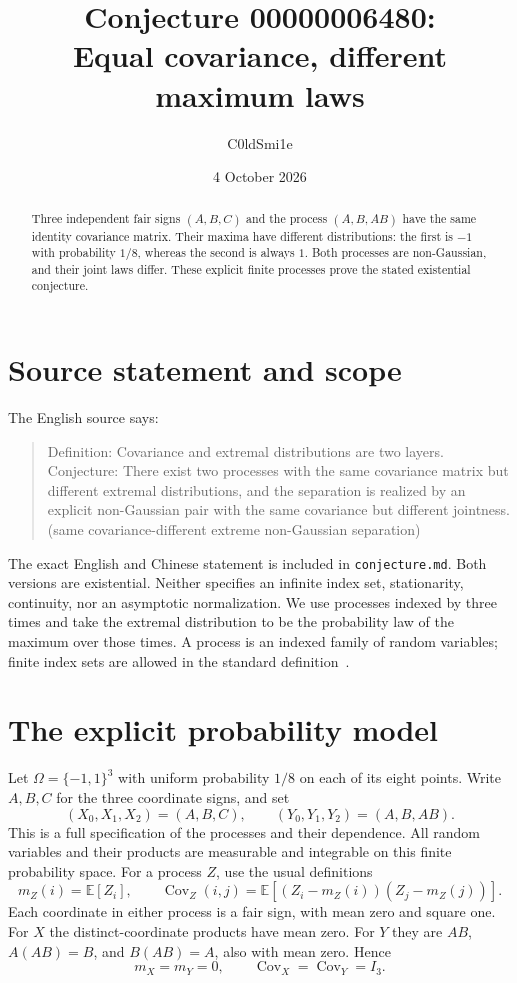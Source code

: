 \documentclass[10pt]{article}
\title{Conjecture 00000006480:\\Equal covariance, different maximum laws}
\author{C0ldSmi1e}
\date{4 October 2026}
\newcommand{\E}{\mathbb E}
\begin{document}
\maketitle
\begin{abstract}
Three independent fair signs $(A,B,C)$ and the process $(A,B,AB)$ have the same identity covariance matrix. Their maxima have different distributions: the first is $-1$ with probability $1/8$, whereas the second is always $1$. Both processes are non-Gaussian, and their joint laws differ. These explicit finite processes prove the stated existential conjecture.
\end{abstract}

\section{Source statement and scope}
The English source says:
\begin{quote}
Definition: Covariance and extremal distributions are two layers. Conjecture: There exist two processes with the same covariance matrix but different extremal distributions, and the separation is realized by an explicit non-Gaussian pair with the same covariance but different jointness. (same covariance-different extreme non-Gaussian separation)
\end{quote}
The exact English and Chinese statement is included in \texttt{conjecture.md}. Both versions are existential. Neither specifies an infinite index set, stationarity, continuity, nor an asymptotic normalization. We use processes indexed by three times and take the extremal distribution to be the probability law of the maximum over those times. A process is an indexed family of random variables; finite index sets are allowed in the standard definition~\cite[\S2.2]{rw}.

\section{The explicit probability model}
Let $\Omega=\{-1,1\}^3$ with uniform probability $1/8$ on each of its eight points. Write $A,B,C$ for the three coordinate signs, and set
\[
 (X_0,X_1,X_2)=(A,B,C),\qquad
 (Y_0,Y_1,Y_2)=(A,B,AB).
\]
This is a full specification of the processes and their dependence. All random variables and their products are measurable and integrable on this finite probability space. For a process $Z$, use the usual definitions
\[
 m_Z(i)=\E[Z_i],\qquad
 \operatorname{Cov}_Z(i,j)=\E[(Z_i-m_Z(i))(Z_j-m_Z(j))].
\]
Each coordinate in either process is a fair sign, with mean zero and square one. For $X$ the distinct-coordinate products have mean zero. For $Y$ they are $AB$, $A(AB)=B$, and $B(AB)=A$, also with mean zero. Hence
\[
 m_X=m_Y=0,\qquad \operatorname{Cov}_X=\operatorname{Cov}_Y=I_3.
\]
\end{document}
